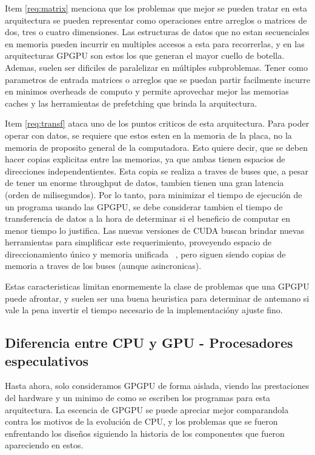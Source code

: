 Item \ref{req:matrix} menciona que los problemas que mejor se pueden tratar en esta
arquitectura se pueden representar como operaciones entre arreglos o matrices de
dos, tres o cuatro dimensiones. Las estructuras de datos que no estan secuenciales
en memoria pueden incurrir en multiples accesos a esta para recorrerlas, y en las
arquitecturas GPGPU son estos los que generan el mayor cuello de botella. Ademas,
suelen ser dificiles de paralelizar en m\'ultiples subproblemas. Tener como parametros de
entrada matrices o arreglos que se puedan partir facilmente incurre en minimos
overheads de computo y permite aprovechar mejor las memorias caches y las herramientas de
prefetching que brinda la arquitectura.

Item \ref{req:transf} ataca uno de los puntos criticos de esta arquitectura. Para poder
operar con datos, se requiere que estos esten en la memoria de la placa, no la memoria
de proposito general de la computadora. Esto quiere decir, que se deben hacer copias
explicitas entre las memorias, ya que ambas tienen espacios de direcciones independentientes.
Esta copia se realiza a traves de buses que, a pesar de tener un enorme throughput de
datos, tambien tienen una gran latencia (orden de milisegundos). Por lo tanto, para minimizar
el tiempo de ejecuci\'on de un programa usando las GPGPU, se debe considerar tambien el
tiempo de transferencia de datos a la hora de determinar si el beneficio de computar en
menor tiempo lo justifica. Las nuevas versiones de CUDA buscan brindar nuevas herramientas
para simplificar este requerimiento, proveyendo espacio de direccionamiento \'unico y
memoria unificada ~\cite{farberCuda}, pero siguen siendo copias de memoria a traves de los
buses (aunque asincronicas).

Estas caracteristicas limitan enormemente la clase de problemas que una GPGPU puede
afrontar, y suelen ser una buena heuristica para determinar de antemano si vale la pena
invertir el tiempo necesario de la implementaci\'ony ajuste fino.


\subsection{Diferencia entre CPU y GPU - Procesadores especulativos}
Hasta ahora, solo consideramos GPGPU de forma aislada, viendo las prestaciones del hardware y un minimo
de como se escriben los programas para esta arquitectura. La escencia de GPGPU se puede apreciar mejor
comparandola contra los motivos de la evoluci\'on de CPU, y los problemas que se fueron enfrentando
los dise\~nos siguiendo la historia de los componentes que fueron apareciendo en estos.

